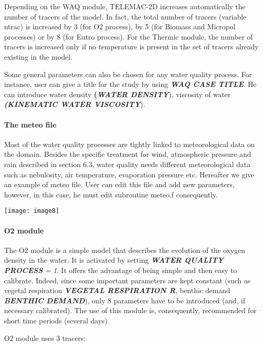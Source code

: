 \documentclass{article} %
\begin{document}
 Depending on the WAQ module, TELEMAC-2D increases automatically the number of tracers of the model. In fact, the total number of tracers (variable ntrac) is increased by 3 (for O2 process), by 5 (for Biomass and Micropol processes) or by 8 (for Eutro process). For the Thermic module, the number of tracers is increased only if no temperature is present in the set of tracers already existing in the model.

 Some general parameters can also be chosen for any water quality process. For instance, user can give a title for the study by using \textbf{\textit{WAQ CASE TITLE}}. He can introduce water density \textbf{(\textit{WATER DENSITY}}), viscosity of water \textbf{\textit{(KINEMATIC WATER VISCOSITY}}).


\paragraph{  The meteo file}

 Most of the water quality processes are tightly linked to meteorological data on the domain. Besides the specific treatment for wind, atmospheric pressure and rain described in section 6.3, water quality needs different meteorological data such as nebulosity, air temperature, evaporation pressure etc. Hereafter we give an example of meteo file. User can edit this file and add new parameters, however, in this case, he must edit subroutine meteo.f consequently.

 \texttt{[image: image8]}


\paragraph{ O2 module}



 The O2 module is a simple model that describes the evolution of the oxygen density in the water. It is activated by setting \textbf{\textit{WATER QUALITY PROCESS}}\textit{ = 1}. It offers the advantage of being simple and then easy to calibrate. Indeed, since some important parameters are kept constant (such as vegetal respiration \textbf{\textit{VEGETAL RESPIRATION R}}, benthic demand \textbf{\textit{BENTHIC DEMAND}}), only 8 parameters have to be introduced (and, if necessary calibrated). The use of this module is, consequently, recommended for short time periods (several days)

 O2 module uses 3 tracers:
\end{document}
